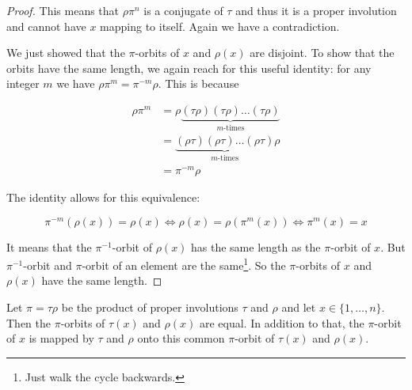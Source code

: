 \begin{proof}
This means that $\rho \pi^n$ is a conjugate of $\tau$ and thus it is a proper involution and cannot have $x$ mapping to itself. Again we have a contradiction.

We just showed that the $\pi$-orbits of $x$ and $\rho(x)$ are disjoint. To show that the orbits have the same length, we again reach for this useful identity: for any integer $m$ we have $\rho \pi^m = \pi^{-m} \rho$. This is because

\begin{align*}
\rho \pi^m &= \rho \underbrace{(\tau\rho) (\tau\rho) \ldots (\tau\rho)}_{m\text{-times}} \\
           &= \underbrace{(\rho \tau) (\rho \tau) \ldots (\rho \tau)}_{m\text{-times}} \rho \\
           &= \pi^{-m} \rho
\end{align*}

The identity allows for this equivalence: 

$$
\pi^{-m}(\rho(x)) = \rho(x) \Leftrightarrow \rho(x) = \rho(\pi^m(x)) \Leftrightarrow \pi^m(x) = x
$$

It means that the $\pi^{-1}$-orbit of $\rho(x)$ has the same length as the $\pi$-orbit of $x$. But $\pi^{-1}$-orbit and $\pi$-orbit of an element are the same\footnote{Just walk the cycle backwards.}.
So the $\pi$-orbits of $x$ and $\rho(x)$ have the same length.
\end{proof}

\begin{thm}\label{involutionproduct2}
Let $\pi = \tau \rho$ be the product of proper involutions $\tau$ and $\rho$ and let $x \in \{1, \ldots, n\}$. Then the $\pi$-orbits of $\tau(x)$ and $\rho(x)$ are equal. In addition to that, the $\pi$-orbit of $x$ is mapped by $\tau$ and $\rho$ onto this common $\pi$-orbit of $\tau(x)$ and $\rho(x)$.
\end{thm}

